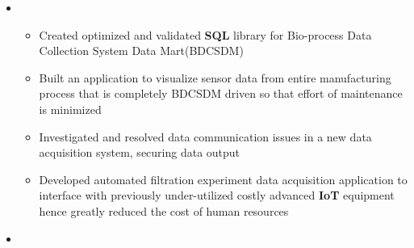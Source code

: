 \documentclass[11pt,a4paper,sans]{moderncv}        %
\begin{document}
\begin{itemize}
	\item{
		{\vspace{3pt}
		    \begin{itemize} pt
				\item Created optimized and validated \textbf{SQL} library for Bio-process Data Collection System Data Mart(BDCSDM) %
				\item Built an application to visualize sensor data from entire manufacturing process that is completely BDCSDM driven so that effort of maintenance is minimized
				\item Investigated and resolved data communication issues in a new data acquisition system, securing data output%
				\item Developed automated filtration experiment data acquisition application to interface with previously under-utilized costly advanced \textbf{IoT} equipment hence greatly reduced the cost of human resources %
			\end{itemize}}}

	\vspace{4pt}

	\item{}

\end{itemize}
\end{document}
